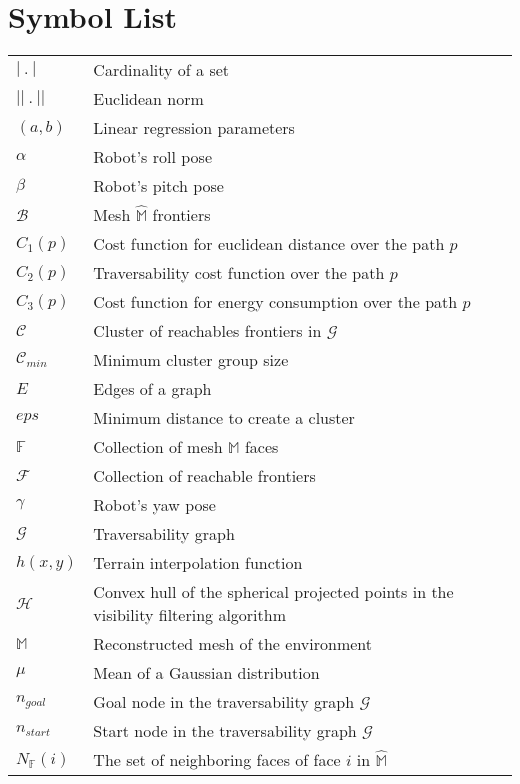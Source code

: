 \chapter*{Symbol List}

\begin{table}[h]
	\begin{tabular}{ll}
		$|~.~|$ 			& Cardinality of a set\\[6pt]
		$||~.~||$      		& Euclidean norm\\[6pt]
		$(a, b)$  			& Linear regression parameters\\[6pt]
		$\alpha$  			& Robot's roll pose\\[6pt]
		$\beta$  			& Robot's pitch pose\\[6pt]
		$\mathcal{B}$  		& Mesh $\hat{\mathbb{M}}$ frontiers\\[6pt]
		$C_1(p)$  			& Cost function for euclidean distance over the path $p$\\[6pt]
		$C_2(p)$  			& Traversability cost function over the path $p$\\[6pt]
		$C_3(p)$  			& Cost function for energy consumption over the path $p$\\[6pt]
		$\mathcal{C}$  		& Cluster of reachables frontiers in $\mathcal{G}$\\[6pt]
		$\mathcal{C}_{min}$ & Minimum cluster group size\\[6pt]
		$E$  				& Edges of a graph\\[6pt]
		$eps$  				& Minimum distance to create a cluster\\[6pt]
		$\mathbb{F}$  		& Collection of mesh $\mathbb{M}$ faces\\[6pt]
		$\mathcal{F}$  		& Collection of reachable frontiers\\[6pt]
		$\gamma$  			& Robot's yaw pose\\[6pt]
		$\mathcal{G}$  		& Traversability graph\\[6pt]
		$h(x, y)$			& Terrain interpolation function\\[6pt]
		$\mathcal{H}$		& Convex hull of the spherical projected points in the visibility filtering algorithm\\[6pt]
		$\mathbb{M}$  		& Reconstructed mesh of the environment\\[6pt]
		$\mu$  				& Mean of a Gaussian distribution\\[6pt]
		$n_{goal}$  		& Goal node in the traversability graph $\mathcal{G}$\\[6pt]
		$n_{start}$  		& Start node in the traversability graph $\mathcal{G}$\\[6pt]
		$N_{\mathbb{F}}(i)$ & The set of neighboring faces of face $i$ in $\hat{\mathbb{M}}$\\
	\end{tabular}
\end{table}

